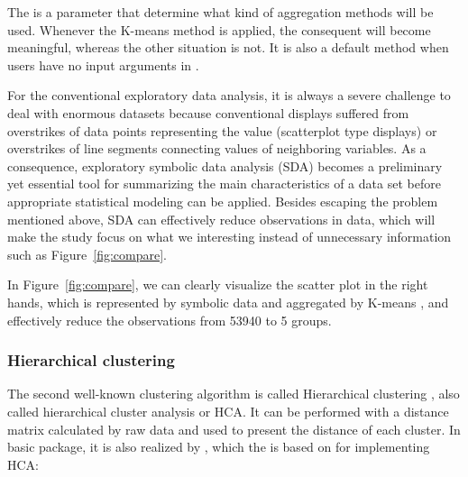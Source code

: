 \documentclass[article]{jss}
\begin{document}
The  is a parameter that determine what kind of aggregation methods will be used. Whenever the K-means method is applied, the consequent  will become meaningful, whereas the other situation is not. It is also a default method when users have no input arguments in .



For the conventional exploratory data analysis, it is always a severe
challenge to deal with enormous datasets because conventional displays
suffered from overstrikes of data points representing the value
(scatterplot type displays) or overstrikes of line segments connecting
values of neighboring variables. As a consequence, exploratory
symbolic data analysis (SDA) becomes a preliminary yet essential tool
for summarizing the main characteristics of a data set before
appropriate statistical modeling can be applied. Besides escaping the
problem mentioned above, SDA can effectively reduce observations in
data, which will make the study focus on what we interesting instead
of unnecessary information such as Figure~\ref{fig:compare}.

In Figure~\ref{fig:compare}, we can clearly visualize the scatter plot
in the right hands, which is represented by symbolic data and
aggregated by K-means \cite{macqueen:1967}, and effectively reduce the
observations from 53940 to 5 groups.


\subsubsection{Hierarchical clustering}

The second well-known clustering algorithm is called Hierarchical clustering \cite{Cecil:1966}, also called hierarchical cluster analysis or HCA. It can be performed with a distance matrix
calculated by raw data and used to present the distance of each cluster. In basic  package, it is also realized by , which the  is based on for implementing HCA:

\begin{CodeChunk}
\end{CodeChunk}
\end{document}
